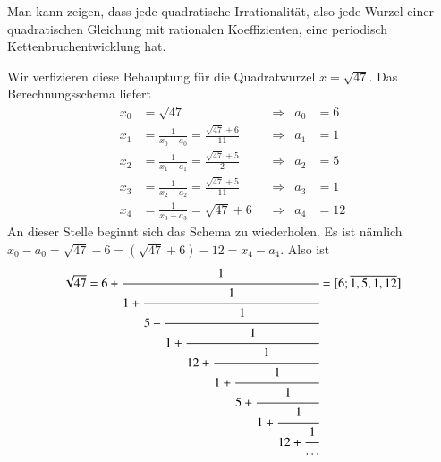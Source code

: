 Man kann zeigen, dass jede quadratische Irrationalität, also jede Wurzel
einer quadratischen Gleichung mit rationalen Koeffizienten, eine periodisch
Kettenbruchentwicklung hat.

\begin{beispiel}
Wir verfizieren diese Behauptung für die Quadratwurzel $x=\sqrt{47}$.
Das Berechnungsschema liefert
\[
\begin{aligned}
x_0&=\sqrt{47}
	&&\Rightarrow&
		a_0 &= 6
\\
x_1&=\frac{1}{x_0-a_0} = \frac{\sqrt{47}+6}{11}
	&&\Rightarrow&
		a_1 &= 1
\\
x_2&=\frac{1}{x_1-a_1} = \frac{\sqrt{47}+5}{2}
	&&\Rightarrow&
		a_2 &= 5
\\
x_3&=\frac{1}{x_2-a_2} = \frac{\sqrt{47}+5}{11}
	&&\Rightarrow&
		a_3 &= 1
\\
x_4&=\frac{1}{x_3-a_3} = \sqrt{47}+6
	&&\Rightarrow&
		a_4 &= 12
\end{aligned}
\]
An dieser Stelle beginnt sich das Schema zu wiederholen.
Es ist nämlich $x_0-a_0 = \sqrt{47}-6 = (\sqrt{47}+6) - 12 = x_4-a_4$.
Also ist
\[
\sqrt{47}
=
6+\cfrac{1}{
1+\cfrac{1}{
5+\cfrac{1}{
1+\cfrac{1}{
12+\cfrac{1}{
1+\cfrac{1}{
5+\cfrac{1}{
1+\cfrac{1}{
12+\cfrac{1}{\dots}}}}}}}}}
=
[6;\overline{1,5,1,12}]
\]
\end{beispiel}



